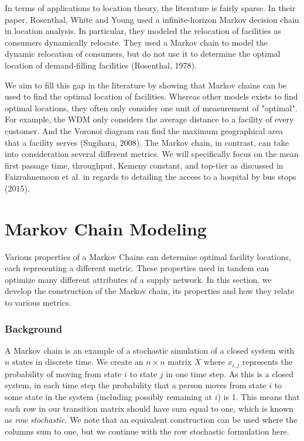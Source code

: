 \documentclass[twoside,twocolumn]{article}
\begin{document}
In terms of applications to location theory, the literature is fairly sparse.
In their paper, Rosenthal, White and Young used a infinite-horizon Markov decision chain in location analysis.
In particular, they modeled the relocation of facilities as consumers dynamically relocate.
They used a Markov chain to model the dynamic relocation of consumers, but do not use it to determine the optimal location of demand-filling facilities (Rosenthal, 1978).

We aim to fill this gap in the literature by showing that Markov chains can be used to find the optimal location of facilities.
Whereas other models exists to find optimal locations, they often only consider one unit of measurement of "optimal".
For example, the WDM only considers the average distance to a facility of every customer.
And the Voronoi diagram can find the maximum geographical area that a facility serves (Sugihara, 2008).
The Markov chain, in contrast, can take into consideration several different metrics.
We will specifically focus on the mean first passage time, throughput, Kemeny constant, and top-tier as discussed in Faizrahnemoon et al. in regards to detailing the access to a hospital by bus stops (2015).

\section{Markov Chain Modeling}

Various properties of a Markov Chains can determine optimal facility locations, each representing a different metric.
These properties used in tandem can optimize many different attributes of a supply network.
In this section, we develop the construction of the Markov chain, its properties and how they relate to various metrics.

\subsubsection{Background}

A Markov chain is an example of a stochastic simulation of a closed system with $n$ states in discrete time.
We create an $n\times n$ matrix $X$ where $x_{i,j}$ represents the probability of moving from state $i$ to state $j$ in one time step.
As this is a closed system, in each time step the probability that a person moves from state $i$ to some state in the system (including possibly remaining at $i$) is 1. 
This means that each row in our transition matrix should have sum equal to one, which is known as {\em row stochastic}.
We note that an equivalent construction can be used where the columns sum to one, but we continue with the row stochastic formulation here.%
\end{document}
